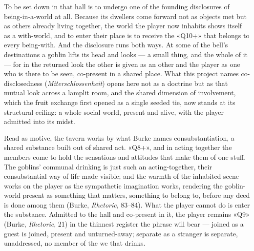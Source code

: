 To be set down in that hall is to undergo one of the founding disclosures of being-in-a-world at all. Because its dwellers come forward not as objects met but as others already living together, the world the player now inhabits shows itself as a with-world, and to enter their place is to receive the «Q10+» that belongs to every being-with. And the disclosure runs both ways. At some of the bell's destinations a goblin lifts its head and looks — a small thing, and the whole of it — for in the returned look the other is given as an other and the player as one who is there to be seen, co-present in a shared place. What this project names co-disclosedness (\textit{Miterschlossenheit}) opens here not as a doctrine but as that mutual look across a lamplit room, and the shared dimension of involvement, which the fruit exchange first opened as a single seeded tie, now stands at its structural ceiling: a whole social world, present and alive, with the player admitted into its midst.

Read as motive, the tavern works by what Burke names consubstantiation, a shared substance built out of shared act. «Q8+», and in acting together the members come to hold the sensations and attitudes that make them of one stuff. The goblins' communal drinking is just such an acting-together, their consubstantial way of life made visible; and the warmth of the inhabited scene works on the player as the sympathetic imagination works, rendering the goblin-world present as something that matters, something to belong to, before any deed is done among them (Burke, \textit{Rhetoric}, 83--84). What the player cannot do is enter the substance. Admitted to the hall and co-present in it, the player remains «Q9» (Burke, \textit{Rhetoric}, 21) in the thinnest register the phrase will bear — joined as a guest is joined, present and unturned-away; separate as a stranger is separate, unaddressed, no member of the we that drinks.

